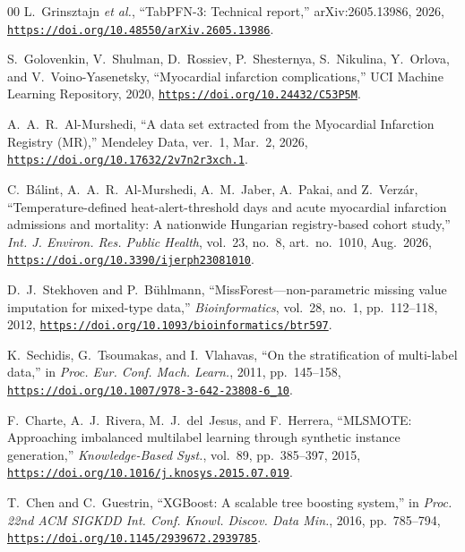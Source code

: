 \documentclass{ieeeaccess}
\begin{document}
\begin{thebibliography}{00}
L.~Grinsztajn \emph{et al.}, ``TabPFN-3: Technical report,'' arXiv:2605.13986, 2026, \href{https://doi.org/10.48550/arXiv.2605.13986}{\nolinkurl{https://doi.org/10.48550/arXiv.2605.13986}}.

S.~Golovenkin, V.~Shulman, D.~Rossiev, P.~Shesternya, S.~Nikulina, Y.~Orlova, and V.~Voino-Yasenetsky, ``Myocardial infarction complications,'' UCI Machine Learning Repository, 2020, \href{https://doi.org/10.24432/C53P5M}{\nolinkurl{https://doi.org/10.24432/C53P5M}}.

A.~A.~R.~Al-Murshedi, ``A data set extracted from the Myocardial Infarction Registry (MR),'' Mendeley Data, ver.~1, Mar.~2, 2026, \href{https://doi.org/10.17632/2v7n2r3xch.1}{\nolinkurl{https://doi.org/10.17632/2v7n2r3xch.1}}.

C.~B\'alint, A.~A.~R.~Al-Murshedi, A.~M.~Jaber, A.~Pakai, and Z.~Verz\'ar, ``Temperature-defined heat-alert-threshold days and acute myocardial infarction admissions and mortality: A nationwide Hungarian registry-based cohort study,'' \emph{Int. J. Environ. Res. Public Health}, vol.~23, no.~8, art.~no.~1010, Aug.~2026, \href{https://doi.org/10.3390/ijerph23081010}{\nolinkurl{https://doi.org/10.3390/ijerph23081010}}.

D.~J.~Stekhoven and P.~B\"{u}hlmann, ``MissForest---non-parametric missing value imputation for mixed-type data,'' \emph{Bioinformatics}, vol.~28, no.~1, pp.~112--118, 2012, \href{https://doi.org/10.1093/bioinformatics/btr597}{\nolinkurl{https://doi.org/10.1093/bioinformatics/btr597}}.

K.~Sechidis, G.~Tsoumakas, and I.~Vlahavas, ``On the stratification of multi-label data,'' in \emph{Proc. Eur. Conf. Mach. Learn.}, 2011, pp.~145--158, \href{https://doi.org/10.1007/978-3-642-23808-6_10}{\nolinkurl{https://doi.org/10.1007/978-3-642-23808-6_10}}.

F.~Charte, A.~J.~Rivera, M.~J.~del~Jesus, and F.~Herrera, ``MLSMOTE: Approaching imbalanced multilabel learning through synthetic instance generation,'' \emph{Knowledge-Based Syst.}, vol.~89, pp.~385--397, 2015, \href{https://doi.org/10.1016/j.knosys.2015.07.019}{\nolinkurl{https://doi.org/10.1016/j.knosys.2015.07.019}}.

T.~Chen and C.~Guestrin, ``XGBoost: A scalable tree boosting system,'' in \emph{Proc. 22nd ACM SIGKDD Int. Conf. Knowl. Discov. Data Min.}, 2016, pp.~785--794, \href{https://doi.org/10.1145/2939672.2939785}{\nolinkurl{https://doi.org/10.1145/2939672.2939785}}.


\end{thebibliography}
\end{document}
